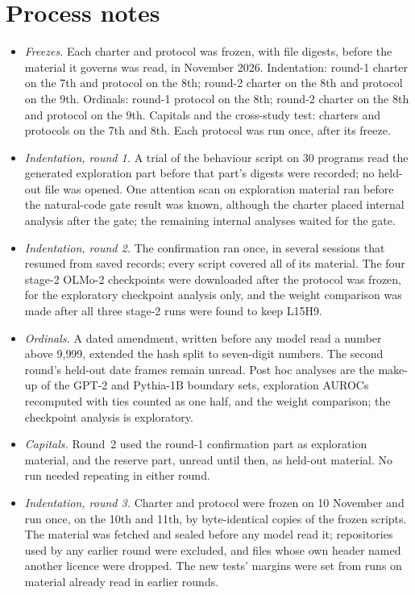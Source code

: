 \documentclass[11pt]{article}
\newcommand{\hd}[2]{L#1H#2}
\begin{document}
\section{Process notes}
\label{app:process}
\begin{itemize}
\item \emph{Freezes.} Each charter and protocol was frozen, with file digests, before the material it governs was read, in November 2026. Indentation: round-1 charter on the 7th and protocol on the 8th; round-2 charter on the 8th and protocol on the 9th. Ordinals: round-1 protocol on the 8th; round-2 charter on the 8th and protocol on the 9th. Capitals and the cross-study test: charters and protocols on the 7th and 8th. Each protocol was run once, after its freeze.
\item \emph{Indentation, round 1.} A trial of the behaviour script on 30 programs read the generated exploration part before that part's digests were recorded; no held-out file was opened. One attention scan on exploration material ran before the natural-code gate result was known, although the charter placed internal analysis after the gate; the remaining internal analyses waited for the gate.
\item \emph{Indentation, round 2.} The confirmation ran once, in several sessions that resumed from saved records; every script covered all of its material. The four stage-2 OLMo-2 checkpoints were downloaded after the protocol was frozen, for the exploratory checkpoint analysis only, and the weight comparison was made after all three stage-2 runs were found to keep \hd{15}{9}.
\item \emph{Ordinals.} A dated amendment, written before any model read a number above 9{,}999, extended the hash split to seven-digit numbers. The second round's held-out date frames remain unread. Post hoc analyses are the make-up of the GPT-2 and Pythia-1B boundary sets, exploration AUROCs recomputed with ties counted as one half, and the weight comparison; the checkpoint analysis is exploratory.
\item \emph{Capitals.} Round~2 used the round-1 confirmation part as exploration material, and the reserve part, unread until then, as held-out material. No run needed repeating in either round.
\item \emph{Indentation, round 3.} Charter and protocol were frozen on 10 November and run once, on the 10th and 11th, by byte-identical copies of the frozen scripts. The material was fetched and sealed before any model read it; repositories used by any earlier round were excluded, and files whose own header named another licence were dropped. The new tests' margins were set from runs on material already read in earlier rounds.

\end{itemize}
\end{document}
